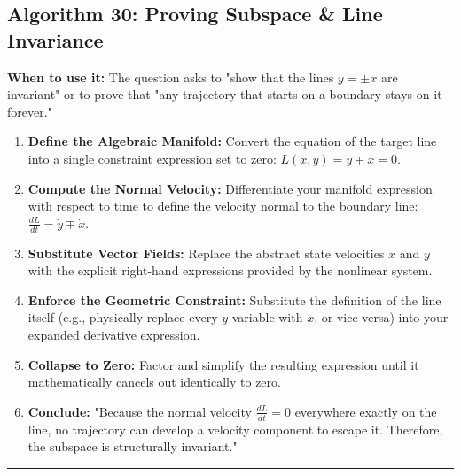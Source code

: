 \documentclass[11pt, a4paper]{report}
\begin{document}
\subsection*{Algorithm 30: Proving Subspace \& Line Invariance}
\textbf{When to use it:} The question asks to "show that the lines $y = \pm x$ are invariant" or to prove that "any trajectory that starts on a boundary stays on it forever."
\begin{enumerate}[label=\textbf{\arabic*.}]
    \item \textbf{Define the Algebraic Manifold:} Convert the equation of the target line into a single constraint expression set to zero: $L(x,y) = y \mp x = 0$.
    \item \textbf{Compute the Normal Velocity:} Differentiate your manifold expression with respect to time to define the velocity normal to the boundary line: $\frac{dL}{dt} = \dot{y} \mp \dot{x}$.
    \item \textbf{Substitute Vector Fields:} Replace the abstract state velocities $\dot{x}$ and $\dot{y}$ with the explicit right-hand expressions provided by the nonlinear system.
    \item \textbf{Enforce the Geometric Constraint:} Substitute the definition of the line itself (e.g., physically replace every $y$ variable with $x$, or vice versa) into your expanded derivative expression.
    \item \textbf{Collapse to Zero:} Factor and simplify the resulting expression until it mathematically cancels out identically to zero.
    \item \textbf{Conclude:} "Because the normal velocity $\frac{dL}{dt} = 0$ everywhere exactly on the line, no trajectory can develop a velocity component to escape it. Therefore, the subspace is structurally invariant."
\end{enumerate}
\vspace{1em}
\noindent\rule{\textwidth}{0.4pt}
\vspace{1em}
\end{document}
